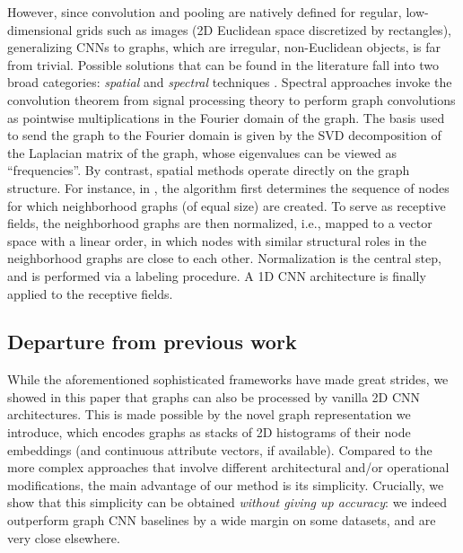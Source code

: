 \documentclass[sigconf]{acmart}
\begin{document}
However, since convolution and pooling are natively defined for regular, low-dimensional grids such as images (2D Euclidean space discretized by rectangles), generalizing CNNs to graphs, which are irregular, non-Euclidean objects, is far from trivial.
Possible solutions that can be found in the literature fall into two broad categories: \textit{spatial} and \textit{spectral} techniques \citep{bruna2013spectral}. Spectral approaches \citep{defferrard2016convolutional,kipf2016semi} invoke the convolution theorem from signal processing theory to perform graph convolutions as pointwise multiplications in the Fourier domain of the graph. The basis used to send the graph to the Fourier domain is given by the SVD decomposition of the Laplacian matrix of the graph, whose eigenvalues can be viewed as ``frequencies''. By contrast, spatial methods \citep{zhang2018end,niepert2016learning,vialatte2016generalizing} operate directly on the graph structure. For instance, in \citep{niepert2016learning}, the algorithm first determines the sequence of nodes for which neighborhood graphs (of equal size) are created. To serve as receptive fields, the neighborhood graphs are then normalized, i.e., mapped to a vector space with a linear order, in which nodes with similar structural roles in the neighborhood graphs are close to each other. Normalization is the central step, and is performed via a labeling procedure. A 1D CNN architecture is finally applied to the receptive fields.

\subsection{Departure from previous work}
While the aforementioned sophisticated frameworks have made great strides, we showed in this paper that graphs can also be processed by vanilla 2D CNN architectures. This is made possible by the novel graph representation we introduce, which encodes graphs as stacks of 2D histograms of their node embeddings (and continuous attribute vectors, if available). Compared to the more complex approaches that involve different architectural and/or operational modifications, the main advantage of our method is its simplicity. Crucially, we show that this simplicity can be obtained \textit{without giving up accuracy}: we indeed outperform graph CNN baselines by a wide margin on some datasets, and are very close elsewhere.
\end{document}

